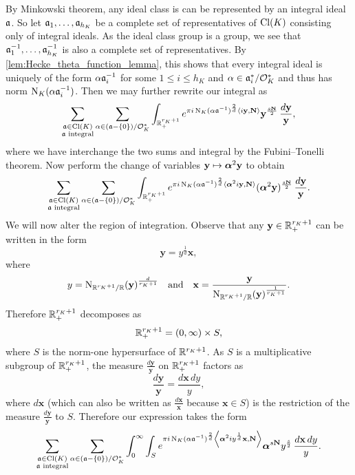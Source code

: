        By Minkowski theorem, any ideal class is can be represented by an integral ideal $\mathfrak{a}$. So let $\mathfrak{a}_{1},\ldots,\mathfrak{a}_{h_{K}}$ be a complete set of representatives of $\operatorname{\mathrm{Cl}}(K)$ consisting only of integral ideals. As the ideal class group is a group, we see that $\mathfrak{a}_{1}^{-1},\ldots,\mathfrak{a}_{h_{K}}^{-1}$ is also a complete set of representatives. By \cref{lem:Hecke_theta_function_lemma}, this shows that every integral ideal is uniquely of the form $\alpha\mathfrak{a}_{i}^{-1}$ for some $1 \le i \le h_{K}$ and $\alpha \in \mathfrak{a}_{i}^{\ast}/\mathcal{O}_{K}^{\ast}$ and thus has norm $\operatorname{\mathrm{N}}_{K}(\alpha\mathfrak{a}_{i}^{-1})$. Then we may further rewrite our integral as
      \[
        \sum_{\substack{\mathfrak{a} \in \operatorname{\mathrm{Cl}}(K) \\ \text{$\mathfrak{a}$ integral}}}\sum_{\alpha \in (\mathfrak{a}-\{0\})/\mathcal{O}_{K}^{\ast}}\int_{\mathbb{R}_{+}^{r_{K}+1}}e^{\pi i\operatorname{\mathrm{N}}_{K}(\alpha\mathfrak{a}^{-1})^{\frac{2}{d}}\langle i\mathbf{y},\mathbf{N}\rangle}\mathbf{y}^{\frac{s\mathbf{N}}{2}}\,\frac{d\mathbf{y}}{\mathbf{y}},
      \]
      where we have interchange the two sums and integral by the Fubini–Tonelli theorem. Now perform the change of variables $\mathbf{y} \mapsto \boldsymbol{\alpha}^{2}\mathbf{y}$ to obtain
      \[
        \sum_{\substack{\mathfrak{a} \in \operatorname{\mathrm{Cl}}(K) \\ \text{$\mathfrak{a}$ integral}}}\sum_{\alpha \in (\mathfrak{a}-\{0\})/\mathcal{O}_{K}^{\ast}}\int_{\mathbb{R}_{+}^{r_{K}+1}}e^{\pi i\operatorname{\mathrm{N}}_{K}(\alpha\mathfrak{a}^{-1})^{\frac{2}{d}}\langle\boldsymbol{\alpha}^{2}i\mathbf{y},\mathbf{N}\rangle}(\boldsymbol{\alpha}^{2}\mathbf{y})^{\frac{s\mathbf{N}}{2}}\,\frac{d\mathbf{y}}{\mathbf{y}}.
      \]
      We will now alter the region of integration. Observe that any $\mathbf{y} \in \mathbb{R}_{+}^{r_{K}+1}$ can be written in the form
      \[
        \mathbf{y} = y^{\frac{1}{d}}\mathbf{x},
      \]
      where
      \[
        y = \operatorname{\mathrm{N}}_{\mathbb{R}^{r_{K}+1}/\mathbb{R}}(\mathbf{y})^{\frac{d}{r_{K}+1}} \quad \text{and} \quad \mathbf{x} = \frac{\mathbf{y}}{\operatorname{\mathrm{N}}_{\mathbb{R}^{r_{K}+1}/\mathbb{R}}(\mathbf{y})^{\frac{1}{r_{K}+1}}}.
      \]
      Therefore $\mathbb{R}_{+}^{r_{K}+1}$ decomposes as
      \[
        \mathbb{R}_{+}^{r_{K}+1} = (0,\infty) \times S,
      \]
      where $S$ is the norm-one hypersurface of $\mathbb{R}^{r_{K}+1}$. As $S$ is a multiplicative subgroup of $\mathbb{R}_{+}^{r_{K}+1}$, the measure $\frac{d\mathbf{y}}{\mathbf{y}}$ on $\mathbb{R}_{+}^{r_{K}+1}$ factors as
      \[
        \frac{d\mathbf{y}}{\mathbf{y}} = \frac{d\mathbf{x}\,dy}{y},
      \]
      where $d\mathbf{x}$ (which can also be written as $\frac{d\mathbf{x}}{\mathbf{x}}$ because $\mathbf{x} \in S$) is the restriction of the measure $\frac{d\mathbf{y}}{\mathbf{y}}$ to $S$. Therefore our expression takes the form
      \[
        \sum_{\substack{\mathfrak{a} \in \operatorname{\mathrm{Cl}}(K) \\ \text{$\mathfrak{a}$ integral}}}\sum_{\alpha \in (\mathfrak{a}-\{0\})/\mathcal{O}_{K}^{\ast}}\int_{0}^{\infty}\int_{S}e^{\pi i\operatorname{\mathrm{N}}_{K}(\alpha\mathfrak{a}^{-1})^{\frac{2}{d}}\left\langle\boldsymbol{\alpha}^{2}iy^{\frac{1}{d}}\mathbf{x},\mathbf{N}\right\rangle}\boldsymbol{\alpha}^{s\mathbf{N}}y^{\frac{s}{2}}\,\frac{d\mathbf{x}\,dy}{y}.
      \]
